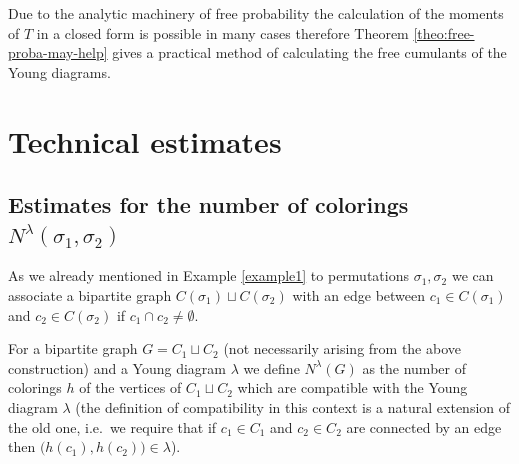 \documentclass[12pt]{amsart}
\theoremstyle{plain}
\theoremstyle{remark}
\newcommand{\N}{\mathbb{N}}
\begin{document}
Due to the analytic machinery of free probability the calculation of the
moments of $T$ in a closed form is possible in many cases therefore
Theorem \ref{theo:free-proba-may-help} gives a practical method of calculating
the free cumulants of the Young diagrams.



\section{Technical estimates}
\label{sec:technical}


\subsection{Estimates for the number of colorings
$N^\lambda(\sigma_1,\sigma_2)$}
\label{eq:estimate-lambda}


As we already mentioned in Example \ref{example1} to permutations $\sigma_1,\sigma_2$
we can associate a bipartite graph $C(\sigma_1)\sqcup C(\sigma_2)$ with an edge between
$c_1\in C(\sigma_1)$ and $c_2\in C(\sigma_2)$ if $c_1\cap c_2\neq \emptyset$.

For a bipartite graph $G=C_1\sqcup C_2$ (not necessarily arising from the above construction)
and a Young diagram $\lambda$ we define $N^{\lambda}(G)$ as the number of colorings $h$
of the vertices of $C_1\sqcup C_2$ which are compatible with the Young diagram $\lambda$
(the definition of compatibility in this context is a natural extension of the old one, 
i.e.\ we require that if $c_1\in C_1$ and $c_2\in C_2$ are connected by an edge then
$\big( h(c_1),h(c_2) \big)\in \lambda$).


\end{document}
